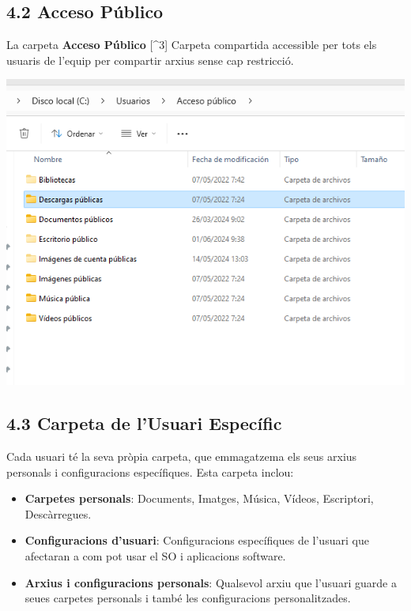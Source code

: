 \documentclass[
  a4paper,
]{article}
\providecommand{\tightlist}{%
  \setlength{\itemsep}{0pt}\setlength{\parskip}{0pt}}
\begin{document}
\subsection{4.2 Acceso Público}\label{acceso-puxfablico}

La carpeta \textbf{Acceso Público} {[}\^{}3{]} Carpeta compartida
accessible per tots els usuaris de l'equip per compartir arxius sense
cap restricció.

\includegraphics{png/CarpetesPublico.png}

\subsection{4.3 Carpeta de l'Usuari
Específic}\label{carpeta-de-lusuari-especuxedfic}

Cada usuari té la seva pròpia carpeta, que emmagatzema els seus arxius
personals i configuracions específiques. Esta carpeta inclou:

\begin{itemize}
\tightlist
\item
  \textbf{Carpetes personals}: Documents, Imatges, Música, Vídeos,
  Escriptori, Descàrregues.
\item
  \textbf{Configuracions d'usuari}: Configuracions específiques de
  l'usuari que afectaran a com pot usar el SO i aplicacions software.
\item
  \textbf{Arxius i configuracions personals}: Qualsevol arxiu que
  l'usuari guarde a seues carpetes personals i també les configuracions
  personalitzades.
\end{itemize}
\end{document}
